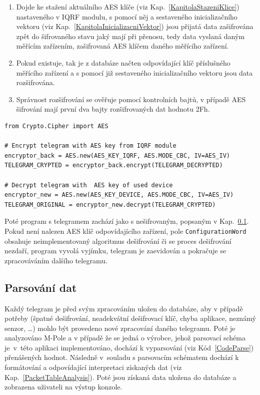 \begin{enumerate}
	\item Dojde ke stažení aktuálního AES klíče (viz Kap.~\ref{KapitolaStazeniKlice}) nastaveného v IQRF modulu, s pomocí něj a sestaveného inicializačního vektoru (viz Kap.~\ref{KapitolaInicializacniVektor})
jsou přijatá data zašifrována zpět do šifrovaného stavu jaký mají při přenosu, tedy data vyslaná daným měřícím zařízením, zašifrovaná AES klíčem daného měřícího zařízení.
	\item Pokud existuje, tak je z databáze načten odpovídající klíč příslušného měřícího zařízení a s pomocí již sestaveného inicializačního vektoru jsou data rozšifrována.
	\item Správnost rozšifrování se ověřuje pomocí kontrolních bajtů, v případě AES šifrování mají první dva bajty rozšifrovaných dat hodnotu 2Fh.
\end{enumerate}

\begin{lstlisting}[caption={Implementace AES dešifrování},captionpos=b,label=CodeAES,style=MyCodePython]
from Crypto.Cipher import AES

# Encrypt telegram with AES key from IQRF module
encryptor_back = AES.new(AES_KEY_IQRF, AES.MODE_CBC, IV=AES_IV)
TELEGRAM_CRYPTED = encryptor_back.encrypt(TELEGRAM_DECRYPTED)

# Decrypt telegram with  AES key of used device
encryptor_new = AES.new(AES_KEY_DEVICE, AES.MODE_CBC, IV=AES_IV)
TELEGRAM_ORIGINAL = encryptor_new.decrypt(TELEGRAM_CRYPTED)
\end{lstlisting}


Poté program s telegramem zachází jako s nešifrovaným, popsaným v Kap.~\ref{KapitolaParsovani}. Pokud není nalezen AES klíč odpovídajícího zařízení, pole \texttt{ConfigurationWord} obsahuje neimplementovaný algoritmus dešifrování či se proces dešifrování nezdaří, program vyvolá vyjímku, telegram je zaevidován a pokračuje se zpracováváním dalšího telegramu.

\subsection{Parsování dat}
\label{KapitolaParsovani}
Každý telegram je před svým zpracováním uložen do databáze, aby v případě potřeby (špatné dešifrování, neadekvátní dešifrovací klíč, chyba aplikace, neznámý senzor, \ldots) mohlo být provedeno nové zpracování daného telegramu. Poté je analyzováno M-Pole a v případě že se jedná o výrobce, jehož parsovací schéma je~v~této aplikaci implementováno, dochází k vyparsování (viz Kód~\ref{CodeParse}) přenášených hodnot. Následně v~souladu s parsovacím schématem dochází k formátování a odpovídající interpretaci získaných dat (viz Kap.~\ref{PacketTableAnalysis}). Poté jsou získaná data uložena do databáze a zobrazena uživateli na výstup konzole.


